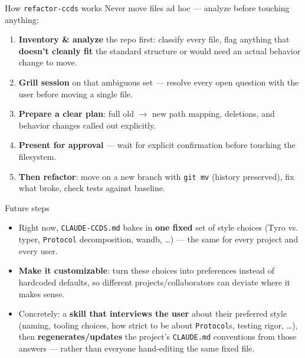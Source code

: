 \documentclass[11pt]{beamer}
\begin{document}
\begin{frame}{How \texttt{refactor-ccds} works}
  \small
  Never move files ad hoc --- analyze before touching anything:
  \begin{enumerate}
    \item \textbf{Inventory \& analyze} the repo first: classify every
      file, flag anything that \textbf{doesn't cleanly fit} the standard
      structure or would need an actual behavior change to move.
    \item \textbf{Grill session} on that ambiguous set --- resolve every
      open question with the user before moving a single file.
    \item \textbf{Prepare a clear plan}: full old $\rightarrow$ new path
      mapping, deletions, and behavior changes called out explicitly.
    \item \textbf{Present for approval} --- wait for explicit confirmation
      before touching the filesystem.
    \item \textbf{Then refactor}: move on a new branch with \texttt{git mv}
      (history preserved), fix what broke, check tests against baseline.
  \end{enumerate}
\end{frame}

\begin{frame}{Future steps}
  \begin{itemize}
    \item Right now, \texttt{CLAUDE-CCDS.md} bakes in \textbf{one fixed}
      set of style choices (Tyro vs. typer, \texttt{Protocol} decomposition,
      wandb, \dots) --- the same for every project and every user.
    \item \textbf{Make it customizable}: turn these choices into
      preferences instead of hardcoded defaults, so different
      projects/collaborators can deviate where it makes sense.
    \item Concretely: a \textbf{skill that interviews the user} about their
      preferred style (naming, tooling choices, how strict to be about
      \texttt{Protocol}s, testing rigor, \dots), then
      \textbf{regenerates/updates} the project's \texttt{CLAUDE.md}
      conventions from those answers --- rather than everyone hand-editing
      the same fixed file.
  \end{itemize}
\end{frame}
\end{document}

